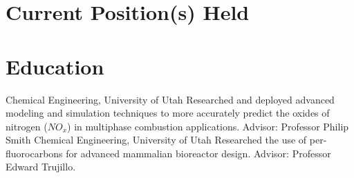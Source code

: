 \documentclass[letterpaper]{twentysecondcv_spd} %
\begin{document}

\section{Current Position(s) Held}

\begin{twentyshort} %
  \end{twentyshort}
  

\section{Education}

\begin{twenty} %
	 {\normalfont Chemical Engineering, University of Utah} {Researched and deployed advanced
modeling and simulation techniques to more accurately predict the oxides of nitrogen ($NO_x$) in multiphase combustion applications. Advisor: Professor Philip Smith}
	 {\normalfont Chemical Engineering, University of Utah} {Researched the use of per-fluorocarbons for advanced mammalian bioreactor design. Advisor: Professor Edward Trujillo.}
\end{twenty}



\end{document}
